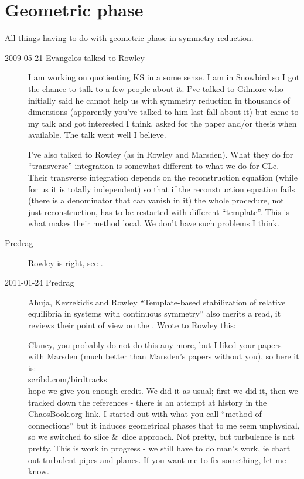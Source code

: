 

\chapter{Geometric phase}
\label{c-geometric}

All things having to do with geometric phase in symmetry reduction.

\begin{description}

\item[2009-05-21 Evangelos talked to Rowley]
I am working on quotienting KS in a some sense. I am in
Snowbird so I got the chance to talk to a few people about
it. I've talked to Gilmore who initially said he cannot help
us with symmetry reduction in thousands of dimensions
(apparently you've talked to him last fall about it) but came
to my talk and got interested I think, asked for the paper
and/or thesis when available. The talk went well I believe.

I've also talked to Rowley (as in Rowley and Marsden). What
they do for ``transverse'' integration is somewhat different to
what we do for CLe. Their transverse integration depends on
the reconstruction equation (while for us it is totally
independent) so that if the reconstruction equation fails
(there is a denominator that can vanish in it) the whole
procedure, not just reconstruction, has to be restarted with
different ``template''. This is what makes their method local.
We don't have such problems I think.

\item[Predrag]
Rowley is right, see .

\item[2011-01-24 Predrag]
Ahuja, Kevrekidis and Rowley
{``Template-based stabilization} of relative equilibria
              in systems with continuous symmetry'' also
merits a read, it reviews their point of view on the \mslices. Wrote to
Rowley this:

Clancy, you probably do not do this any more, but I liked your papers
with Marsden (much better than Marsden's papers without you), so here it
is:
\\
{scribd.com/birdtracks}
\\
hope we give you enough credit. We did it as usual; first we did it, then we tracked
down the references - there is an attempt at history in the ChaosBook.org link.
I started out with what you call ``method of connections'' but it induces
geometrical phases that to me seem unphysical, so we switched to
slice \&\ dice approach. Not pretty, but turbulence is not pretty.
This is work in progress - we still have to do man's work, ie chart out
turbulent pipes and planes. If you want me to fix something, let me know.


\end{description}
